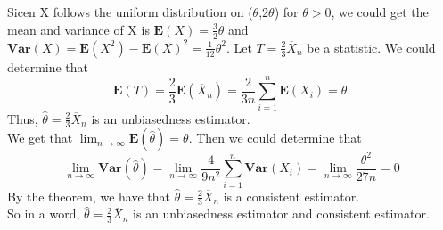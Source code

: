 \documentclass[10.5pt]{article}
\begin{document}
\subsection{}
Sicen X follows the uniform distribution on ($\theta$,2$\theta$) for $\theta>0$, we could get the mean and variance of X is $\mathbf{E}(X)=\frac{3}{2}\theta$ and $\mathbf{Var}(X)=\mathbf{E}(X^2)-\mathbf{E}(X)^2=\frac{1}{12}\theta^2$. Let $T=\frac{2}{3}\overline{X}_n$ be a statistic. We could determine that $$\mathbf{E}(T)=\frac{2}{3}\mathbf{E}(\overline{X}_n)=\frac{2}{3n}\sum_{i=1}^n\mathbf{E}(X_i)=\theta.$$\indent
Thus, $\hat{\theta}=\frac{2}{3}\overline{X}_n$ is an unbiasedness estimator.\\\indent
We get that $\lim_{n\to\infty}\mathbf{E}(\hat{\theta})=\theta$. Then we could determine that $$\lim_{n\to\infty}\mathbf{Var}(\hat{\theta})=\lim_{n\to\infty}\frac{4}{9n^2}\sum_{i=1}^n\mathbf{Var}(X_i)=\lim_{n\to\infty}\frac{\theta^2}{27n}=0$$\indent
By the theorem, we have that $\hat{\theta}=\frac{2}{3}\overline{X}_n$ is a consistent estimator.\\\indent
So in a word, $\hat{\theta}=\frac{2}{3}\overline{X}_n$ is an unbiasedness estimator and consistent estimator.
\end{document}
